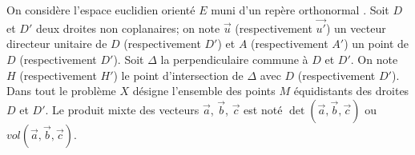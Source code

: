 On considère l'espace euclidien orienté $E$ muni d'un repère orthonormal \repere.\newline 
Soit $D$ et $D'$ deux droites non coplanaires; on note $\overrightarrow{u}$ (respectivement $\overrightarrow{u'}$)
un vecteur directeur unitaire de $D$ (respectivement $D'$) et $A$ (respectivement $A'$) un point de $D$ (respectivement $D'$).\newline
Soit $\Delta$ la perpendiculaire commune à $D$ et $D'$. On note $H$ (respectivement $H'$) le point d'intersection de $\Delta$ avec $D$ (respectivement $D'$).\newline
Dans tout le problème $X$ désigne l'ensemble des points $M$ équidistants des droites $D$ et $D'$.\newline
Le produit mixte des vecteurs $\overrightarrow{a}$, $\overrightarrow{b}$, $\overrightarrow{c}$ est noté $\det(\overrightarrow{a},\overrightarrow{b},\overrightarrow{c})$ ou $vol(\overrightarrow{a},\overrightarrow{b},\overrightarrow{c})$.
\begin{figure}
	\centering
	
\end{figure}

